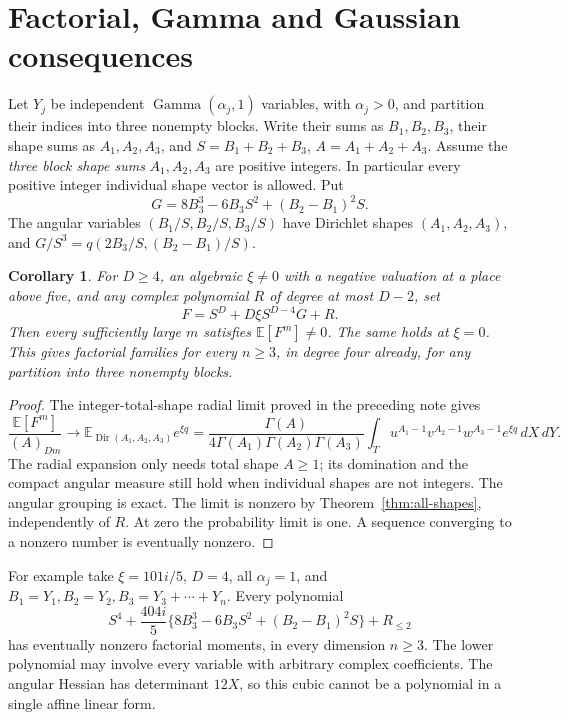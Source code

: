 \documentclass[11pt]{article}
\newtheorem{corollary}[theorem]{Corollary}
\begin{document}
\section{Factorial, Gamma and Gaussian consequences}
Let $Y_j$ be independent $\operatorname{Gamma}(\alpha_j,1)$ variables,
with $\alpha_j>0$, and partition their indices into three nonempty blocks.
Write their sums as $B_1,B_2,B_3$, their shape sums as $A_1,A_2,A_3$, and
$S=B_1+B_2+B_3$, $A=A_1+A_2+A_3$. Assume the \emph{three block shape sums}
$A_1,A_2,A_3$ are positive integers. In particular every positive integer
individual shape vector is allowed. Put
\[
 G=8B_3^3-6B_3S^2+(B_2-B_1)^2S.
\]
The angular variables $(B_1/S,B_2/S,B_3/S)$ have Dirichlet shapes
$(A_1,A_2,A_3)$, and
$G/S^3=q(2B_3/S,(B_2-B_1)/S)$.

\begin{corollary}\label{cor:family}
For $D\ge4$, an algebraic $\xi\ne0$ with a negative valuation at a place
above five, and any complex polynomial $R$ of degree at most $D-2$, set
\[
 F=S^D+D\xi S^{D-4}G+R.
\]
Then every sufficiently large $m$ satisfies $\mathbb E[F^m]\ne0$.
The same holds at $\xi=0$. This gives factorial families for every $n\ge3$,
in degree four already, for any partition into three nonempty blocks.
\end{corollary}
\begin{proof}
The integer-total-shape radial limit proved in the preceding note gives
\[
 \frac{\mathbb E[F^m]}{(A)_{Dm}}
 \longrightarrow \mathbb E_{\operatorname{Dir}(A_1,A_2,A_3)}e^{\xi q}
 =\frac{\Gamma(A)}{4\Gamma(A_1)\Gamma(A_2)\Gamma(A_3)}
 \int_Tu^{A_1-1}v^{A_2-1}w^{A_3-1}e^{\xi q}\,dX\,dY.
\]
The radial expansion only needs total shape $A\ge1$; its domination and
the compact angular measure still hold when individual shapes are not
integers. The angular grouping is exact. The limit is nonzero by
Theorem~\ref{thm:all-shapes}, independently of $R$. At zero the probability
limit is one. A sequence converging to a nonzero number is eventually nonzero.
\end{proof}

For example take $\xi=101i/5$, $D=4$, all $\alpha_j=1$, and
$B_1=Y_1,B_2=Y_2,B_3=Y_3+\cdots+Y_n$. Every polynomial
\[
 S^4+\frac{404i}{5}\{8B_3^3-6B_3S^2+(B_2-B_1)^2S\}+R_{\le2}
\]
has eventually nonzero factorial moments, in every dimension $n\ge3$.
The lower polynomial may involve every variable with arbitrary complex
coefficients. The angular Hessian has determinant $12X$, so this cubic
cannot be a polynomial in a single affine linear form.
\end{document}
